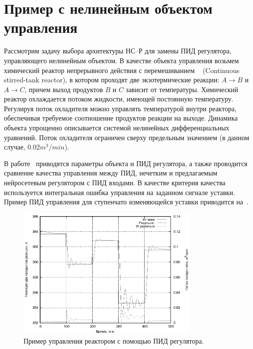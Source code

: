 

\section{Пример с нелинейным объектом управления}

Рассмотрим задачу выбора архитектуры НС--Р для замены ПИД регулятора,
управляющего нелинейным объектом.  В качестве объекта управления
возьмем химический реактор непрерывного действия с перемешиванием
~\cite{wiki-cstr} (Continuous stirred-tank reactor), в котором
проходят две экзотермические реакции: $A\rightarrow B$ и $A\rightarrow
C$, причем выход продуктов $B$ и $C$ зависит от температуры.
Химический реактор охлаждается потоком жидкости, имеющей постоянную
температуру.  Регулируя поток охладителя можно управлять температурой
внутри реактора, обеспечивая требуемое соотношение продуктов реакции
на выходе.  Динамика объекта упрощенно описывается системой нелинейных
дифференциальных уравнений.  Поток охладителя ограничен сверху
предельным значением (в данном случае, $0.02 m^3/min$).

В работе~\cite{vas-bak2009} приводятся параметры объекта и ПИД
регулятора, а также проводится сравнение качества управления между
ПИД, нечетким и предлагаемым нейросетевым регулятором с ПИД входами.
В качестве критерия качества используется интегральная ошибка
управления на заданном сигнале уставки.  Пример ПИД управления для
ступенчато изменяющейся уставки приводится
на~.

\begin{figure}[h]
\centering
\includegraphics[width=0.8\textwidth,%
  totalheight=0.35\textheight]{cstr_pid_ru}
\caption{Пример управления реактором с помощью ПИД регулятора.}%
\label{fig:cstr_pid_ru}
\end{figure}

